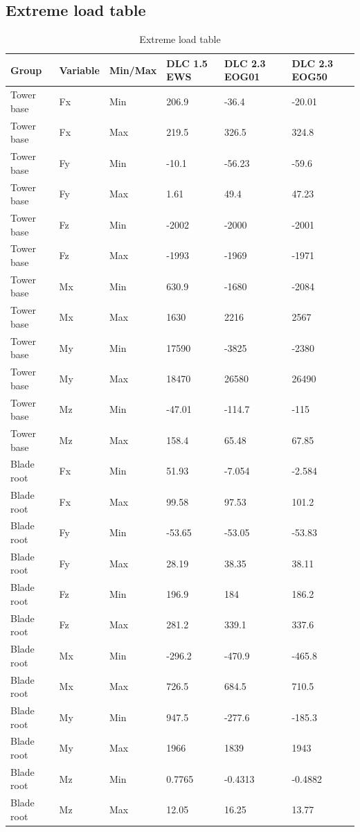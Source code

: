 \documentclass[10pt]{article}
\begin{document}
\subsection{Extreme load table}

\begin{table}[H]
\centering
\begin{tabular}{ | l | l | l | l | l | l | }
\hline
	\textbf{Group} & \textbf{Variable} & \textbf{Min/Max} & \textbf{DLC 1.5 EWS} & \textbf{DLC 2.3 EOG01} & \textbf{DLC 2.3 EOG50} \\ \hline \hline
	Tower base & Fx & Min & 206.9 & -36.4 & -20.01 \\ \hline
	Tower base & Fx & Max & 219.5 & 326.5 & 324.8 \\ \hline
	Tower base & Fy & Min & -10.1 & -56.23 & -59.6 \\ \hline
	Tower base & Fy & Max & 1.61 & 49.4 & 47.23 \\ \hline
	Tower base & Fz & Min & -2002 & -2000 & -2001 \\ \hline
	Tower base & Fz & Max & -1993 & -1969 & -1971 \\ \hline
	Tower base & Mx & Min & 630.9 & -1680 & -2084 \\ \hline
	Tower base & Mx & Max & 1630 & 2216 & 2567 \\ \hline
	Tower base & My & Min & 17590 & -3825 & -2380 \\ \hline
	Tower base & My & Max & 18470 & 26580 & 26490 \\ \hline
	Tower base & Mz & Min & -47.01 & -114.7 & -115 \\ \hline
	Tower base & Mz & Max & 158.4 & 65.48 & 67.85 \\ \hline
	Blade root & Fx & Min & 51.93 & -7.054 & -2.584 \\ \hline
	Blade root & Fx & Max & 99.58 & 97.53 & 101.2 \\ \hline
	Blade root & Fy & Min & -53.65 & -53.05 & -53.83 \\ \hline
	Blade root & Fy & Max & 28.19 & 38.35 & 38.11 \\ \hline
	Blade root & Fz & Min & 196.9 & 184 & 186.2 \\ \hline
	Blade root & Fz & Max & 281.2 & 339.1 & 337.6 \\ \hline
	Blade root & Mx & Min & -296.2 & -470.9 & -465.8 \\ \hline
	Blade root & Mx & Max & 726.5 & 684.5 & 710.5 \\ \hline
	Blade root & My & Min & 947.5 & -277.6 & -185.3 \\ \hline
	Blade root & My & Max & 1966 & 1839 & 1943 \\ \hline
	Blade root & Mz & Min & 0.7765 & -0.4313 & -0.4882 \\ \hline
	Blade root & Mz & Max & 12.05 & 16.25 & 13.77 \\ \hline
\end{tabular}
\caption{Extreme load table}
\label{tab:exloadtable}
\end{table}
\end{document}
